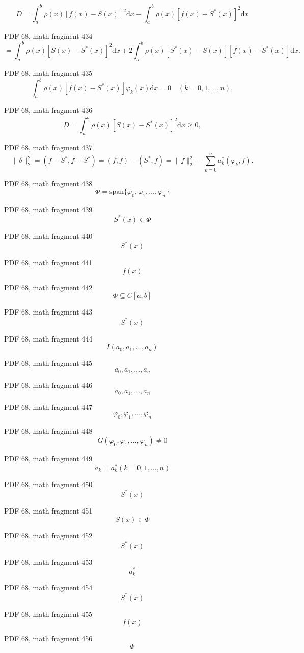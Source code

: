 \documentclass[UTF8,fontset=fandol]{ctexart}
\begin{document}
\[
D = \int_a^b \rho(x) [f(x) - S(x)]^2 \mathrm{d}x - \int_a^b \rho(x) [f(x) - S^*(x)]^2 \mathrm{d}x
\]
\par
PDF 68, math fragment 434
\[
= \int_a^b \rho(x) [S(x) - S^*(x)]^2 \mathrm{d}x + 2 \int_a^b \rho(x) [S^*(x) - S(x)] [f(x) - S^*(x)] \mathrm{d}x.
\]
\par
PDF 68, math fragment 435
\[
\int_a^b \rho(x) [f(x) - S^*(x)] \varphi_k(x) \mathrm{d}x = 0 \quad (k = 0, 1, \dots, n),
\]
\par
PDF 68, math fragment 436
\[
D = \int_a^b \rho(x) [S(x) - S^*(x)]^2 \mathrm{d}x \geqslant 0,
\]
\par
PDF 68, math fragment 437
\[
\|\delta\|_2^2 = (f - S^*, f - S^*) = (f, f) - (S^*, f) = \|f\|_2^2 - \sum_{k=0}^n a_k^* (\varphi_k, f). \tag{3.3.15}
\]
\par
PDF 68, math fragment 438
\[\Phi = \text{span}\{\varphi_0, \varphi_1, \dots, \varphi_n\}\]
\par
PDF 68, math fragment 439
\[S^*(x) \in \Phi\]
\par
PDF 68, math fragment 440
\[S^*(x)\]
\par
PDF 68, math fragment 441
\[f(x)\]
\par
PDF 68, math fragment 442
\[\Phi \subseteq C[a, b]\]
\par
PDF 68, math fragment 443
\[S^*(x)\]
\par
PDF 68, math fragment 444
\[I(a_0, a_1, \dots, a_n)\]
\par
PDF 68, math fragment 445
\[a_0, a_1, \dots, a_n\]
\par
PDF 68, math fragment 446
\[a_0, a_1, \dots, a_n\]
\par
PDF 68, math fragment 447
\[\varphi_0, \varphi_1, \dots, \varphi_n\]
\par
PDF 68, math fragment 448
\[G(\varphi_0, \varphi_1, \dots, \varphi_n) \neq 0\]
\par
PDF 68, math fragment 449
\[a_k = a_k^* (k = 0, 1, \dots, n)\]
\par
PDF 68, math fragment 450
\[S^*(x)\]
\par
PDF 68, math fragment 451
\[S(x) \in \Phi\]
\par
PDF 68, math fragment 452
\[S^*(x)\]
\par
PDF 68, math fragment 453
\[a_k^*\]
\par
PDF 68, math fragment 454
\[S^*(x)\]
\par
PDF 68, math fragment 455
\[f(x)\]
\par
PDF 68, math fragment 456
\[\Phi\]
\par
\end{document}
